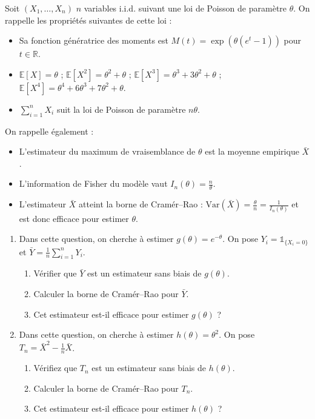 \begin{mdframed}
\begin{exercice}
Soit $(X_1, \dots, X_n)$ $n$ variables i.i.d. suivant une loi de Poisson de paramètre $\theta$. On rappelle les propriétés suivantes de cette loi :

\begin{itemize}
    \item Sa fonction génératrice des moments est $M(t) = \exp(\theta(e^t - 1))$ pour $t \in \mathbb{R}$.
    \item $\mathbb{E}[X] = \theta$ ; $\mathbb{E}[X^2] = \theta^2 + \theta$ ; $\mathbb{E}[X^3] = \theta^3 + 3\theta^2 + \theta$ ; $\mathbb{E}[X^4] = \theta^4 + 6\theta^3 + 7\theta^2 + \theta$.
    \item $\sum_{i=1}^n X_i$ suit la loi de Poisson de paramètre $n\theta$.
\end{itemize}

On rappelle également :

\begin{itemize}
    \item L'estimateur du maximum de vraisemblance de $\theta$ est la moyenne empirique $\bar{X}$.
    \item L'information de Fisher du modèle vaut $I_n(\theta) = \frac{n}{\theta}$.
    \item L'estimateur $\bar{X}$ atteint la borne de Cramér--Rao : $\text{Var}(\bar{X}) = \frac{\theta}{n} = \frac{1}{I_n(\theta)}$ et est donc efficace pour estimer $\theta$.
\end{itemize}

\begin{enumerate}
    \item Dans cette question, on cherche à estimer $g(\theta) = e^{-\theta}$. On pose $Y_i = \mathbb{1}_{\{X_i=0\}}$ et $\bar{Y} = \frac{1}{n}\sum_{i=1}^n Y_i$.
    \begin{enumerate}
        \item Vérifier que $\bar{Y}$ est un estimateur sans biais de $g(\theta)$.
        \item Calculer la borne de Cramér--Rao pour $\bar{Y}$.
        \item Cet estimateur est-il efficace pour estimer $g(\theta)$ ?
    \end{enumerate}
    \item Dans cette question, on cherche à estimer $h(\theta) = \theta^2$. On pose $T_n = \bar{X}^2 - \frac{1}{n}\bar{X}$.
    \begin{enumerate}
        \item Vérifiez que $T_n$ est un estimateur sans biais de $h(\theta)$.
        \item Calculer la borne de Cramér--Rao pour $T_n$.
        \item Cet estimateur est-il efficace pour estimer $h(\theta)$ ?
    \end{enumerate}
\end{enumerate}
\end{exercice}
\end{mdframed}
